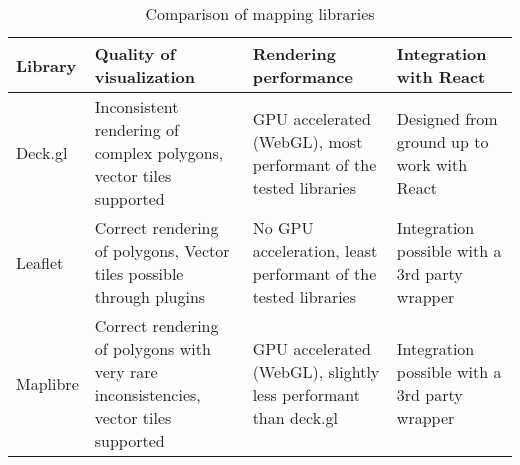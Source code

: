 \begin{table}[h]
	\caption{Comparison of mapping libraries}
	\label{tab:map library comparison}
	\centering
	\begin{tabular}{ | L{0.1\textwidth} | L{0.25\textwidth} | L{0.25\textwidth} | L{0.25\textwidth} | }
		\hline
		Library
		& Quality of visualization
		& Rendering performance
		& Integration with React
		\\ 
		\hline
		\hline
		Deck.gl
		& Inconsistent rendering of complex polygons, vector tiles supported
		& GPU accelerated (WebGL), most performant of the tested libraries
		& Designed from ground up to work with React
		\\
		\hline
		Leaflet
		& Correct rendering of polygons, Vector tiles possible through plugins
		& No GPU acceleration, least performant of the tested libraries
		& Integration possible with a 3rd party wrapper
		\\
		\hline
		Maplibre
		& Correct rendering of polygons with very rare inconsistencies, vector tiles supported
		& GPU accelerated (WebGL), slightly less performant than deck.gl
		& Integration possible with a 3rd party wrapper
		\\
		\hline
	\end{tabular}
\end{table}

